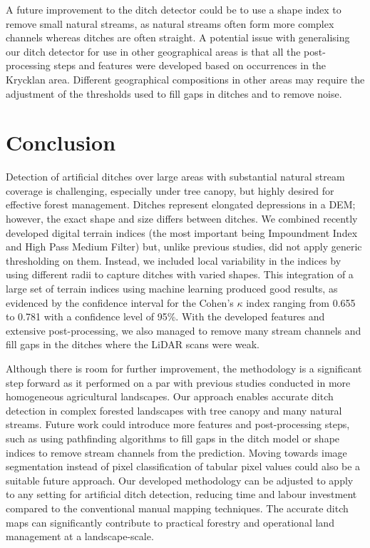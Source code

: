 \documentclass[11pt, review]{elsarticle} %
\begin{document}
A future improvement to the ditch detector could be to use a shape index to remove small natural streams, as natural streams often form more complex channels whereas ditches are often straight. A potential issue with generalising our ditch detector for use in other geographical areas is that all the post-processing steps and features were developed based on occurrences in the Krycklan area. Different geographical compositions in other areas may require the adjustment of the thresholds used to fill gaps in ditches and to remove noise.

\section{Conclusion}

Detection of artificial ditches over large areas with substantial natural stream coverage is challenging, especially under tree canopy, but highly desired for effective forest management. Ditches represent elongated depressions in a DEM; however, the exact shape and size differs between ditches. We combined recently developed digital terrain indices (the most important being Impoundment Index and High Pass Medium Filter) but, unlike previous studies, did not apply generic thresholding on them. Instead, we included local variability in the indices by using different radii to capture ditches with varied shapes. This integration of a large set of terrain indices using machine learning produced good results, as evidenced by the confidence interval for the Cohen's $\kappa$ index ranging from 0.655 to 0.781 with a confidence level of 95\%. With the developed features and extensive post-processing, we also managed to remove many stream channels and fill gaps in the ditches where the LiDAR scans were weak. 

Although there is room for further improvement, the methodology is a significant step forward as it performed on a par with previous studies conducted in more homogeneous agricultural landscapes. Our approach enables accurate ditch detection in complex forested landscapes with tree canopy and many natural streams. Future work could introduce more features and post-processing steps, such as using pathfinding algorithms to fill gaps in the ditch model or shape indices to remove stream channels from the prediction. Moving towards image segmentation instead of pixel classification of tabular pixel values could also be a suitable future approach. Our developed methodology can be adjusted to apply to any setting for artificial ditch detection, reducing time and labour investment compared to the conventional manual mapping techniques. The accurate ditch maps can significantly contribute to practical forestry and operational land management at a landscape-scale.
\end{document}

